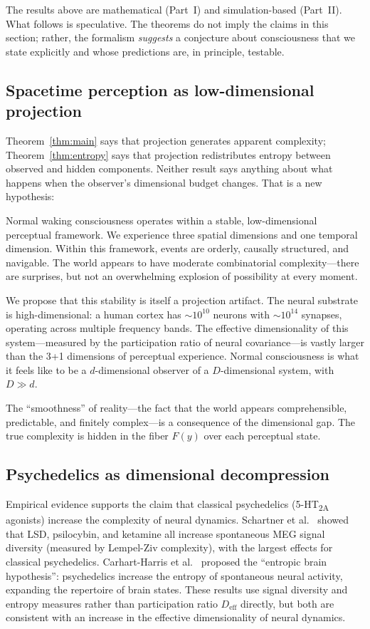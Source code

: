 \documentclass[12pt,a4paper]{article}
\begin{document}
The results above are mathematical (Part~I) and simulation-based (Part~II).
What follows is speculative.
The theorems do not imply the claims in this section; rather, the formalism \emph{suggests} a conjecture about consciousness that we state explicitly and whose predictions are, in principle, testable.

\subsection{Spacetime perception as low-dimensional projection}

Theorem~\ref{thm:main} says that projection generates apparent complexity; Theorem~\ref{thm:entropy} says that projection redistributes entropy between observed and hidden components.
Neither result says anything about what happens when the observer's dimensional budget changes.
That is a new hypothesis:

Normal waking consciousness operates within a stable, low-dimensional perceptual framework.
We experience three spatial dimensions and one temporal dimension.
Within this framework, events are orderly, causally structured, and navigable.
The world appears to have moderate combinatorial complexity---there are surprises, but not an overwhelming explosion of possibility at every moment.

We propose that this stability is itself a projection artifact.
The neural substrate is high-dimensional: a human cortex has $\sim 10^{10}$ neurons with $\sim 10^{14}$ synapses, operating across multiple frequency bands.
The effective dimensionality of this system---measured by the participation ratio of neural covariance---is vastly larger than the 3+1 dimensions of perceptual experience.
Normal consciousness is what it feels like to be a $d$-dimensional observer of a $D$-dimensional system, with $D \gg d$.

The ``smoothness'' of reality---the fact that the world appears comprehensible, predictable, and finitely complex---is a consequence of the dimensional gap.
The true complexity is hidden in the fiber $F(y)$ over each perceptual state.

\subsection{Psychedelics as dimensional decompression}

Empirical evidence supports the claim that classical psychedelics (5-HT\textsubscript{2A} agonists) increase the complexity of neural dynamics.
Schartner et al.~\citeyearpar{schartner2017} showed that LSD, psilocybin, and ketamine all increase spontaneous MEG signal diversity (measured by Lempel-Ziv complexity), with the largest effects for classical psychedelics.
Carhart-Harris et al.~\citeyearpar{carhart-harris2014} proposed the ``entropic brain hypothesis'': psychedelics increase the entropy of spontaneous neural activity, expanding the repertoire of brain states.
These results use signal diversity and entropy measures rather than participation ratio $D_{\mathrm{eff}}$ directly, but both are consistent with an increase in the effective dimensionality of neural dynamics.
\end{document}
